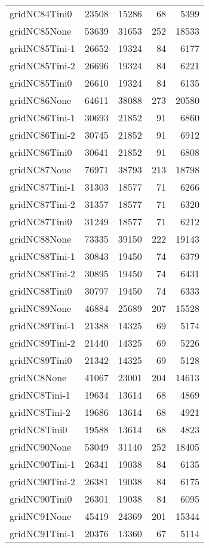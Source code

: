 \begin{longtable}{lrrrr}
gridNC84Tini0 & 23508 & 15286 & 68 & 5399 \\
gridNC85None & 53639 & 31653 & 252 & 18533 \\
gridNC85Tini-1 & 26652 & 19324 & 84 & 6177 \\
gridNC85Tini-2 & 26696 & 19324 & 84 & 6221 \\
gridNC85Tini0 & 26610 & 19324 & 84 & 6135 \\
gridNC86None & 64611 & 38088 & 273 & 20580 \\
gridNC86Tini-1 & 30693 & 21852 & 91 & 6860 \\
gridNC86Tini-2 & 30745 & 21852 & 91 & 6912 \\
gridNC86Tini0 & 30641 & 21852 & 91 & 6808 \\
gridNC87None & 76971 & 38793 & 213 & 18798 \\
gridNC87Tini-1 & 31303 & 18577 & 71 & 6266 \\
gridNC87Tini-2 & 31357 & 18577 & 71 & 6320 \\
gridNC87Tini0 & 31249 & 18577 & 71 & 6212 \\
gridNC88None & 73335 & 39150 & 222 & 19143 \\
gridNC88Tini-1 & 30843 & 19450 & 74 & 6379 \\
gridNC88Tini-2 & 30895 & 19450 & 74 & 6431 \\
gridNC88Tini0 & 30797 & 19450 & 74 & 6333 \\
gridNC89None & 46884 & 25689 & 207 & 15528 \\
gridNC89Tini-1 & 21388 & 14325 & 69 & 5174 \\
gridNC89Tini-2 & 21440 & 14325 & 69 & 5226 \\
gridNC89Tini0 & 21342 & 14325 & 69 & 5128 \\
gridNC8None & 41067 & 23001 & 204 & 14613 \\
gridNC8Tini-1 & 19634 & 13614 & 68 & 4869 \\
gridNC8Tini-2 & 19686 & 13614 & 68 & 4921 \\
gridNC8Tini0 & 19588 & 13614 & 68 & 4823 \\
gridNC90None & 53049 & 31140 & 252 & 18405 \\
gridNC90Tini-1 & 26341 & 19038 & 84 & 6135 \\
gridNC90Tini-2 & 26381 & 19038 & 84 & 6175 \\
gridNC90Tini0 & 26301 & 19038 & 84 & 6095 \\
gridNC91None & 45419 & 24369 & 201 & 15344 \\
gridNC91Tini-1 & 20376 & 13360 & 67 & 5114 \\

\end{longtable}
